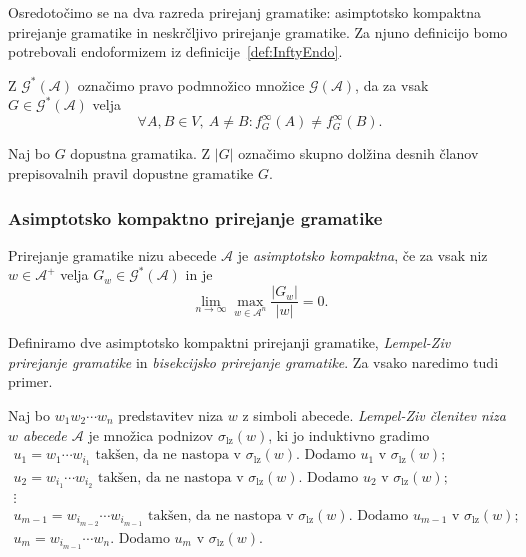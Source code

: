 \documentclass[fin1, tisk]{fmfdelo}
\providecommand{\abs}[1]{\left\lvert #1 \right\rvert}
\newcommand{\A}{\mathcal{A}}
\newcommand{\G}{\mathcal{G}}
\theoremstyle{definition}
\begin{document}
Osredotočimo se na dva razreda prirejanj gramatike: asimptotsko kompaktna prirejanje gramatike
in neskrčljivo prirejanje gramatike. Za njuno definicijo bomo potrebovali endoformizem 
iz definicije~\ref{def:InftyEndo}.

\begin{definicija}
    Z $\G^*(\A)$ označimo pravo podmnožico množice $\G(\A)$, da za vsak $G \in \G^*(\A)$ velja
    \[
        \forall A,B \in V, \ A \neq B \colon f_G^\infty(A) \neq f_G^\infty(B).
    \]
\end{definicija}

\begin{definicija}
    Naj bo $G$ dopustna gramatika. Z $\abs{G}$ označimo skupno dolžina desnih članov prepisovalnih
    pravil dopustne gramatike $G$.
\end{definicija}

\subsubsection{Asimptotsko kompaktno prirejanje gramatike}

\begin{definicija}
    Prirejanje gramatike nizu abecede $\A$ je \textit{asimptotsko kompaktna}, če za vsak niz
    $w \in \A^+$ velja $G_w \in \G^*(\A)$ in je
    \[
        \lim_{n \rightarrow \infty} \max_{w \in \A^n} \frac{\abs{G_w}}{\abs{w}} = 0.
    \]
\end{definicija}

Definiramo dve asimptotsko kompaktni prirejanji gramatike, \emph{Lempel-Ziv prirejanje gramatike}
in \emph{bisekcijsko prirejanje gramatike}. Za vsako naredimo tudi primer.

\begin{definicija}
    Naj bo $ w_1w_2 \cdots w_n$ predstavitev niza $w$ z simboli abecede. 
    \emph{Lempel-Ziv členitev niza $w$ abecede $\A$} je množica podnizov $\sigma_\text{lz}(w)$,
    ki jo induktivno gradimo
    \begin{gather*}
        u_1 = w_1 \cdots w_{i_1} \text{ takšen, da ne nastopa v } \sigma_{\text{lz}}(w). \text{ Dodamo }
        u_1 \text{ v } \sigma_{\text{lz}}(w); \\
        u_2 = w_{i_1} \cdots w_{i_2} \text{ takšen, da ne nastopa v } \sigma_{\text{lz}}(w). \text{ Dodamo }
        u_2 \text{ v } \sigma_{\text{lz}}(w); \\
        \vdots \\
        u_{m-1} = w_{i_{m-2}} \cdots w_{i_{m-1}} \text{ takšen, da ne nastopa v } 
        \sigma_{\text{lz}}(w). \text{ Dodamo } u_{m-1} \text{ v } \sigma_{\text{lz}}(w); \\
        u_m = w_{i_{m-1}} \cdots w_n. \text{ Dodamo } u_m \text{ v } \sigma_{\text{lz}}(w).
    \end{gather*}
\end{definicija}
\end{document}

